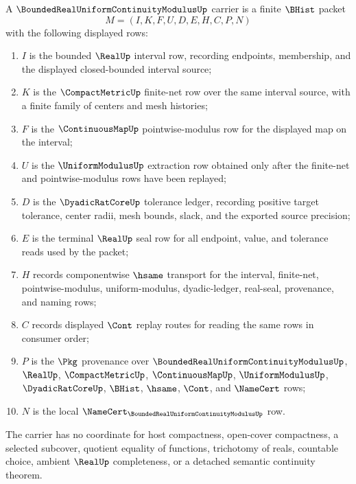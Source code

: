 \begin{definition}
\label{def:bounded-real-uniform-continuity-modulus}
A $\BoundedRealUniformContinuityModulusUp$ carrier is a finite $\BHist$ packet
$$
M=(I,K,F,U,D,E,H,C,P,N)
$$
with the following displayed rows:
\begin{enumerate}
\item $I$ is the bounded $\RealUp$ interval row, recording endpoints, membership, and the displayed closed-bounded interval source;
\item $K$ is the $\CompactMetricUp$ finite-net row over the same interval source, with a finite family of centers and mesh histories;
\item $F$ is the $\ContinuousMapUp$ pointwise-modulus row for the displayed map on the interval;
\item $U$ is the $\UniformModulusUp$ extraction row obtained only after the finite-net and pointwise-modulus rows have been replayed;
\item $D$ is the $\DyadicRatCoreUp$ tolerance ledger, recording positive target tolerance, center radii, mesh bounds, slack, and the exported source precision;
\item $E$ is the terminal $\RealUp$ seal row for all endpoint, value, and tolerance reads used by the packet;
\item $H$ records componentwise $\hsame$ transport for the interval, finite-net, pointwise-modulus, uniform-modulus, dyadic-ledger, real-seal, provenance, and naming rows;
\item $C$ records displayed $\Cont$ replay routes for reading the same rows in consumer order;
\item $P$ is the $\Pkg$ provenance over $\BoundedRealUniformContinuityModulusUp$, $\RealUp$, $\CompactMetricUp$, $\ContinuousMapUp$, $\UniformModulusUp$, $\DyadicRatCoreUp$, $\BHist$, $\hsame$, $\Cont$, and $\NameCert$ rows;
\item $N$ is the local $\NameCert_{\BoundedRealUniformContinuityModulusUp}$ row.
\end{enumerate}
The carrier has no coordinate for host compactness, open-cover compactness, a selected subcover, quotient equality of functions, trichotomy of reals, countable choice, ambient $\RealUp$ completeness, or a detached semantic continuity theorem.
\end{definition}

